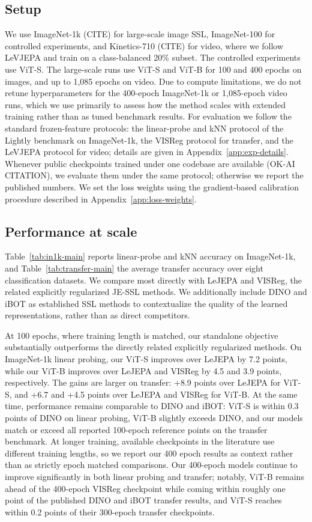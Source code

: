 \documentclass{article} %
\theoremstyle{remark}
\begin{document}
\subsection{Setup}
\label{sec:exp-setup}
We use ImageNet-1k (CITE) for large-scale image SSL, ImageNet-100 for controlled experiments, and Kinetics-710 (CITE) for video, where we follow LeVJEPA and train on a class-balanced 20\% subset. The controlled experiments use ViT-S. The large-scale runs use ViT-S and ViT-B for 100 and 400 epochs on images, and up to 1{,}085 epochs on video. Due to compute limitations, we do not retune hyperparameters for the 400-epoch ImageNet-1k or 1{,}085-epoch video runs, which we use primarily to assess how the method scales with extended training rather than as tuned benchmark results. For evaluation we follow the standard frozen-feature protocols: the linear-probe and kNN protocol of the Lightly benchmark on ImageNet-1k, the VISReg protocol for transfer, and the LeVJEPA protocol for video; details are given in Appendix~\ref{app:exp-details}. Whenever public checkpoints trained under one codebase are available (OK-AI CITATION), we evaluate them under the same protocol; otherwise we report the published numbers. We set the loss weights using the gradient-based calibration procedure described in Appendix~\ref{app:loss-weights}.

\subsection{Performance at scale}
Table~\ref{tab:in1k-main} reports linear-probe and kNN accuracy on ImageNet-1k, and Table~\ref{tab:transfer-main} the average transfer accuracy over eight classification datasets. We compare most directly with LeJEPA and VISReg, the related explicitly regularized JE-SSL methods. We additionally include DINO and iBOT as established SSL methods to contextualize the quality of the learned representations, rather than as direct competitors.

At 100 epochs, where training length is matched, our standalone objective substantially outperforms the directly related explicitly regularized methods. On ImageNet-1k linear probing, our ViT-S improves over LeJEPA by 7.2 points, while our ViT-B improves over LeJEPA and VISReg by 4.5 and 3.9 points, respectively. The gains are larger on transfer: +8.9 points over LeJEPA for ViT-S, and +6.7 and +4.5 points over LeJEPA and VISReg for ViT-B. At the same time, performance remains comparable to DINO and iBOT: ViT-S is within 0.3 points of DINO on linear probing, ViT-B slightly exceeds DINO, and our models match or exceed all reported 100-epoch reference points on the transfer benchmark. At longer training, available checkpoints in the literature use different training lengths, so we report our 400 epoch results as context rather than as strictly epoch matched comparisons. Our 400-epoch models continue to improve significantly in both linear probing and transfer; notably, ViT-B remains ahead of the 400-epoch VISReg checkpoint while coming within roughly one point of the published DINO and iBOT transfer results, and ViT-S reaches within 0.2 points of their 300-epoch transfer checkpoints.
\end{document}
